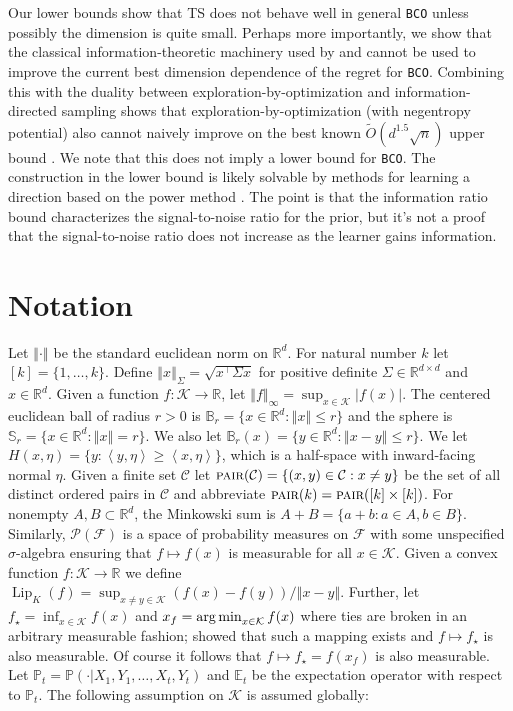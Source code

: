 \documentclass[letter, 12pt]{report}
\newcommand{\pair}{\operatorname{\textsc{pair}}}
\newcommand{\R}{\mathbb R}
\newcommand{\argmin}{\operatornamewithlimits{arg\,min}}
\newcommand{\ip}[1]{\left \langle #1 \right \rangle}
\newcommand{\sphere}{\mathbb{S}}
\newcommand{\ball}{\mathbb{B}}
\newcommand{\norm}[1]{\left \Vert  #1 \right \Vert}
\newcommand{\E}{\mathbb E}
\newcommand{\cK}{\mathcal K}
\newcommand{\cC}{\mathcal C}
\newcommand{\sF}{\mathscr F}
\newcommand{\sP}{\mathscr P}
\newcommand{\bbP}{\mathbb P}
\newcommand{\lip}{\operatorname{Lip}}
\newcommand{\1}{\mathbf{1}}
\newcommand{\bco}{\texttt{BCO}\xspace}
\newcommand{\ts}{\textsc{TS}\xspace}
\theoremstyle{plain}
\theoremstyle{definition}
\theoremstyle{remark}
\begin{document}
Our lower bounds show that \ts does not behave well in general \bco unless possibly the dimension is quite small.
Perhaps more importantly, we show that the classical information-theoretic machinery used by \cite{BE18} and \cite{Lat20-cvx} cannot be used to improve the current
best dimension dependence of the regret for \bco.
Combining this with the duality between exploration-by-optimization and information-directed sampling
shows that exploration-by-optimization (with negentropy potential) also cannot naively improve on the best known $\tilde O(d^{1.5} \sqrt{n})$ upper bound \citep{ZL19,LG23}.
We note that this does not imply a lower bound for \bco.
The construction in the lower bound is likely solvable by methods for learning a direction based on the power method \citep{lattimore2021bandit,huang2021optimal}.
The point is that the information ratio bound characterizes the signal-to-noise ratio for the prior, but it's not a proof that the signal-to-noise ratio does not increase
as the learner gains information.

\section{Notation}
Let $\norm{\cdot}$ be the standard euclidean norm on $\R^d$.
For natural number $k$ let $[k] = \{1,\ldots,k\}$.
Define $\norm{x}_\Sigma = \sqrt{x^\top \Sigma x}$ for positive definite $\Sigma \in \R^{d\times d}$ and $x \in \R^d$.
Given a function $f : \cK \to \R$, let $\norm{f}_\infty = \sup_{x \in \cK} |f(x)|$.
The centered euclidean ball of radius $r > 0$ is $\ball_r = \{x \in \R^d : \norm{x} \leq r\}$ and
the sphere is $\sphere_r = \{x \in \R^d : \norm{x} = r\}$. We also let $\ball_r(x) = \{y \in \R^d : \norm{x - y} \leq r\}$.
We let $H(x, \eta) = \{y : \ip{y, \eta} \geq \ip{x, \eta}\}$, which is a half-space with inward-facing normal $\eta$.
Given a finite set $\cC$ let $\pair(\cC) = \{(x, y) \in \cC : x \neq y\}$ be the set of all distinct ordered pairs in $\cC$ and abbreviate $\pair(k) = \pair([k] \times [k])$.
For nonempty $A,B\subset\mathbb{R}^d$, the Minkowski sum is $A+B=\{a+b:a\in A,b\in B\}$.
Similarly, $\sP(\sF)$ is a space of probability measures on $\sF$ with some unspecified $\sigma$-algebra ensuring that $f \mapsto f(x)$
is measurable for all $x \in \cK$.
Given a convex function $f : \cK \to \R$ we define $\lip_K(f) = \sup_{x \neq y \in \cK} (f(x) - f(y)) / \norm{x - y}$.
Further, let $f_\star = \inf_{x \in \cK} f(x)$ and $x_f = \argmin_{x \in \cK} f(x)$ where ties are broken in an arbitrary measurable fashion;
\citep{niemiro1992asymptotics} showed that such a mapping exists and $f \mapsto f_\star$ is also measurable.
Of course it follows that $f \mapsto f_\star = f(x_f)$ is also measurable.
Let $\bbP_t = \bbP(\cdot|X_1,Y_1,\ldots,X_t,Y_t)$ and $\E_t$ be the expectation operator with respect to $\bbP_t$.
The following assumption on $\cK$ is assumed globally:
\end{document}
